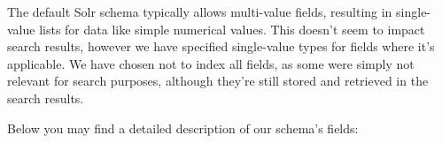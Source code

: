 The default Solr schema typically allows multi-value fields, resulting in single-value lists for data like simple numerical values. This doesn't seem to impact search results, however we have specified single-value types for fields where it's applicable. We have chosen not to index all fields, as some were simply not relevant for search purposes, although they're still stored and retrieved in the search results.

Below you may find a detailed description of our schema's fields:

